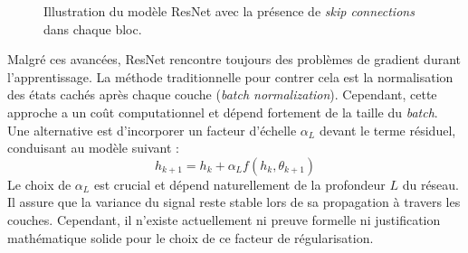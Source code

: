 \begin{figure}[htbp]
    \centering
    \caption{Illustration du modèle ResNet avec la présence de \textit{skip connections} dans chaque bloc.}
    \label{fig:resnet}
\end{figure}

Malgré ces avancées, ResNet rencontre toujours des problèmes de gradient durant l'apprentissage. La méthode traditionnelle pour contrer cela est la normalisation des états cachés après chaque couche (\textit{batch normalization}). Cependant, cette approche a un coût computationnel et dépend fortement de la taille du \textit{batch}. Une alternative est d'incorporer un facteur d'échelle $\alpha_L$ devant le terme résiduel, conduisant au modèle suivant :
\begin{equation}\label{resnet_equation}
    h_{k+1} = h_k + \alpha_L f(h_k, \theta_{k+1})
\end{equation}
Le choix de $\alpha_L$ est crucial et dépend naturellement de la profondeur $L$ du réseau. Il assure que la variance du signal reste stable lors de sa propagation à travers les couches. Cependant, il n'existe actuellement ni preuve formelle ni justification mathématique solide pour le choix de ce facteur de régularisation.

